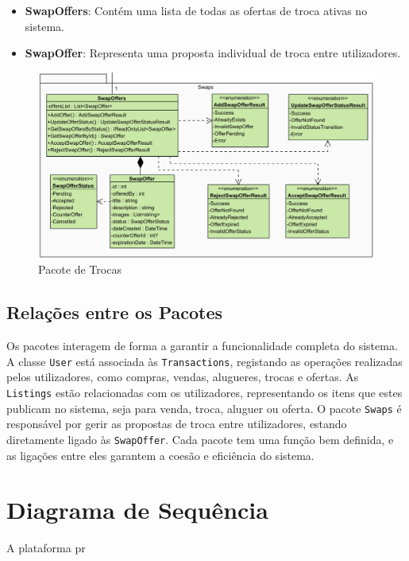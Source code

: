 \documentclass[a4paper, 12pt]{article} %
\begin{document}
\begin{itemize} 
	\item \textbf{SwapOffers}: Contém uma lista de todas as ofertas de troca ativas no sistema. 
	\item \textbf{SwapOffer}: Representa uma proposta individual de troca entre utilizadores.
\end{itemize}

\begin{figure}[ht]
	\centering
	\includegraphics[width=\textwidth]{diagrama_classes_trocas.png}
	\caption{Pacote de Trocas}
	\label{fig:w}
\end{figure}

\subsection{Relações entre os Pacotes}

Os pacotes interagem de forma a garantir a funcionalidade completa do sistema. A classe \texttt{User} está associada às \texttt{Transactions}, registando as operações realizadas pelos utilizadores, como compras, vendas, alugueres, trocas e ofertas. As \texttt{Listings} estão relacionadas com os utilizadores, representando os itens que estes publicam no sistema, seja para venda, troca, aluguer ou oferta. O pacote \texttt{Swaps} é responsável por gerir as propostas de troca entre utilizadores, estando diretamente ligado às \texttt{SwapOffer}. Cada pacote tem uma função bem definida, e as ligações entre eles garantem a coesão e eficiência do sistema.
\newpage
\section*{Diagrama de Sequência}

A plataforma pr
\end{document}

